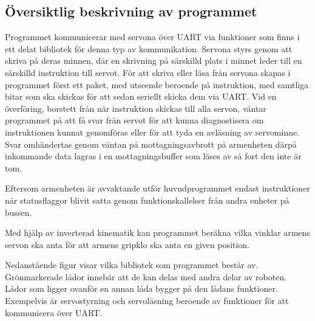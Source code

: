 \subsection{Översiktlig beskrivning av programmet}

Programmet kommunicerar med servona över UART via funktioner som finns i ett delat bibliotek för denna typ av kommunikation. Servona styrs genom att skriva på deras minnen, där en skrivning på särskilld plats i minnet leder till en särskilld instruktion till servot. För att skriva eller läsa från servona skapas i programmet först ett paket, med utseende beroende på instruktion, med samtliga bitar som ska skickas för att sedan seriellt skicka dem via UART. Vid en överföring, borstett från när instruktion skickas till alla servon, väntar programmet på att få svar från servot för att kunna diagnostisera om instruktionen kunnat genomföras eller för att tyda en avläsning av servominne. Svar omhändertas genom väntan på mottagningsavbrott på armenheten därpå inkommande data lagras i en mottagningsbuffer som läses av så fort den inte är tom.

Eftersom armenheten är avvaktande utför huvudprogrammet endast instruktioner när statusflaggor blivit satta genom funktionskallelser från andra enheter på bussen. 

Med hjälp av inverterad kinematik kan programmet beräkna vilka vinklar armens servon ska anta för att armens gripklo ska anta en given position.

Nedanstående figur visar vilka bibliotek som programmet består av. Grönmarkerade lådor innebär att de kan delas med andra delar av roboten. Lådor som ligger ovanför en annan låda bygger på den lådans funktioner. Exempelvis är servostyrning och servoläsning beroende av funktioner för att kommunicera över UART.

